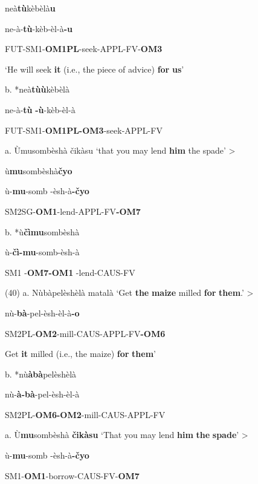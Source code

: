 \documentclass[output=paper]{langscibook}
\begin{document}
  neà\textbf{tù}kèbèlà\textbf{u}

  ne-à-\textbf{tù}{}-kèb-èl-à\textbf{{}-u}

FUT-SM1-\textbf{OM1PL}{}-seek-APPL-FV-\textbf{OM3}

\glt ‘He will seek \textbf{it} (i.e., the piece of advice) \textbf{for} \textbf{us}’

b.  *neà\textbf{tùù}kèbèlà

  ne-à-\textbf{tù}  \textbf{{}-ù}{}-kèb-èl-à

  FUT-SM1-\textbf{OM1PL-OM3}{}-seek-APPL-FV

\ea%
    \label{ex:lukusa:39}
    \z

           a.  Ùmusombèshà {čikàsu   ‘that you may lend \textbf{him} the spade’    >}

{ù\textbf{mu}sombèshà\textbf{čyo}}

{  ù-\textbf{mu}{}-somb  {}-èsh-à\textbf{{}-}\textbf{čyo}}

{SM2SG-\textbf{OM1}{}-lend-APPL-FV\textbf{{}-OM7}}


{    b.  *ù\textbf{čìmu}sombèshà}

{        ù-\textbf{čì-mu}{}-somb-èsh-à}

{  SM1  {}-\textbf{OM7-OM1}  {}-lend-CAUS-FV}

{(40)   a.} Nùbàpelèshèlà matalà    ‘Get \textbf{the} \textbf{maize} milled \textbf{for} \textbf{them}.’  >

{  nù-\textbf{bà}{}-pel-èsh-èl-à\textbf{{}-}\textbf{o}}

{SM2PL-\textbf{OM2}{}-mill-CAUS-APPL-FV\textbf{{}-OM6}}

{{\textasciigrave}Get \textbf{it} milled (i.e., the maize) \textbf{for} \textbf{them}’}

b.  {*nù\textbf{àbà}pelèshèlà}

{     nù-\textbf{à-bà}{}-pel-èsh-èl-à}

{  SM2PL-\textbf{OM6-OM2}{}-mill-CAUS-APPL-FV}

\ea%
    \label{ex:lukusa:41}
    \z

           a.  Ù\textbf{mu}sombèshà {\textbf{čikàsu}    ‘That you may lend \textbf{him} \textbf{the} \textbf{spade}’  >}

{  ù-\textbf{mu}{}-somb  {}-èsh-à\textbf{{}-}\textbf{čyo}}

    SM1-\textbf{OM1}{}-borrow-CAUS-FV-\textbf{OM7}
\end{document}
